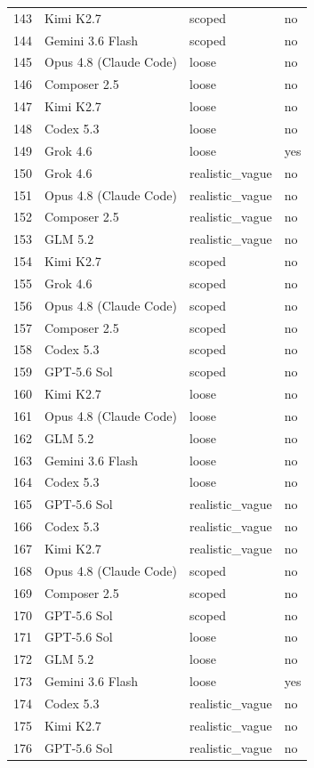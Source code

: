 \begin{tabular}{llll}
143 & Kimi K2.7 & scoped & no \\
144 & Gemini 3.6 Flash & scoped & no \\
145 & Opus 4.8 (Claude Code) & loose & no \\
146 & Composer 2.5 & loose & no \\
147 & Kimi K2.7 & loose & no \\
148 & Codex 5.3 & loose & no \\
149 & Grok 4.6 & loose & yes \\
150 & Grok 4.6 & realistic\_vague & no \\
151 & Opus 4.8 (Claude Code) & realistic\_vague & no \\
152 & Composer 2.5 & realistic\_vague & no \\
153 & GLM 5.2 & realistic\_vague & no \\
154 & Kimi K2.7 & scoped & no \\
155 & Grok 4.6 & scoped & no \\
156 & Opus 4.8 (Claude Code) & scoped & no \\
157 & Composer 2.5 & scoped & no \\
158 & Codex 5.3 & scoped & no \\
159 & GPT-5.6 Sol & scoped & no \\
160 & Kimi K2.7 & loose & no \\
161 & Opus 4.8 (Claude Code) & loose & no \\
162 & GLM 5.2 & loose & no \\
163 & Gemini 3.6 Flash & loose & no \\
164 & Codex 5.3 & loose & no \\
165 & GPT-5.6 Sol & realistic\_vague & no \\
166 & Codex 5.3 & realistic\_vague & no \\
167 & Kimi K2.7 & realistic\_vague & no \\
168 & Opus 4.8 (Claude Code) & scoped & no \\
169 & Composer 2.5 & scoped & no \\
170 & GPT-5.6 Sol & scoped & no \\
171 & GPT-5.6 Sol & loose & no \\
172 & GLM 5.2 & loose & no \\
173 & Gemini 3.6 Flash & loose & yes \\
174 & Codex 5.3 & realistic\_vague & no \\
175 & Kimi K2.7 & realistic\_vague & no \\
176 & GPT-5.6 Sol & realistic\_vague & no \\

\end{tabular}
